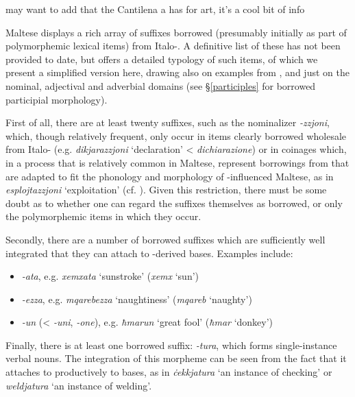 \documentclass[output=paper]{langsci/langscibook}
\begin{document}
may want to add that the Cantilena a has  for art, it's a cool bit of info

Maltese displays a rich array of  suffixes borrowed (presumably initially as part of polymorphemic lexical items) from Italo-. A definitive list of these has not been provided to date, but \cite{Saade2019} offers a detailed typology of such items, of which we present a simplified version here, drawing also on examples from \cite{brincatmifsud2015}, and  just on the nominal, adjectival and adverbial domains (see §\ref{participles} for borrowed participial morphology).


First of all, there are at least twenty suffixes, such as the nominalizer \textit{-zzjoni}, which, though relatively frequent, only occur in items clearly borrowed wholesale from Italo- (e.g. \textit{dikjarazzjoni} `declaration' <  \textit{dichiarazione}) or in coinages which, in a process that is relatively common in Maltese, represent borrowings from  that are adapted to fit the phonology and morphology of -influenced Maltese, as in \textit{esplojtazzjoni} `exploitation' (cf. \citealt{gattfabri2018}). Given this restriction, there must be some doubt as to whether one can regard the suffixes themselves as borrowed, or only the polymorphemic items in which they occur.

Secondly, there are a number of borrowed suffixes which are sufficiently well integrated that they can attach to -derived bases. Examples include:

\begin{itemize}[noitemsep]
	\item[] \textit{-ata}, e.g. \textit{xemxata} `sunstroke' (\textit{xemx} `sun')

    \item[] \textit{-ezza}, e.g. \textit{mqarebezza} `naughtiness' (\textit{mqareb} `naughty')

    \item[] \textit{-un} (<  \textit{-uni},  \textit{-one}), e.g. \textit{ħmarun} `great fool' (\textit{ħmar} `donkey')
\end{itemize}

Finally, there is at least one borrowed suffix: \textit{-tura}, which forms single-instance verbal nouns. The integration of this morpheme can be seen from the fact that it attaches to productively to  bases, as in \textit{ċekkjatura} `an instance of checking' or \textit{weldjatura} `an instance of welding'.
\end{document}
